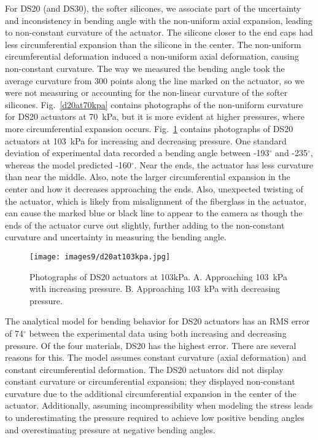 For DS20 (and DS30), the softer silicones, we associate part of the uncertainty and inconsistency in bending angle with the non-uniform axial expansion, leading to non-constant curvature of the actuator. The silicone closer to the end caps had less circumferential expansion than the silicone in the center. The non-uniform circumferential deformation induced a non-uniform axial deformation, causing non-constant curvature. The way we measured the bending angle took the average curvature from 300 points along the line marked on the actuator, so we were not measuring or accounting for the non-linear curvature of the softer silicones. Fig.~\ref{d20at70kpa} contains photographs of the non-uniform curvature for DS20 actuators at 70~kPa, but it is more evident at higher pressures, where more circumferential expansion occurs. Fig.~\ref{fig:d20at103kpa} contains photographs of DS20 actuators at 103~kPa for increasing and decreasing pressure. One standard deviation of experimental data recorded a bending angle between -193$^\circ$ and -235$^\circ$, whereas the model predicted -160$^\circ$. Near the ends, the actuator has less curvature than near the middle. Also, note the larger circumferential expansion in the center and how it decreases approaching the ends. Also, unexpected twisting of the actuator, which is likely from misalignment of the fiberglass in the actuator, can cause the marked blue or black line to appear to the camera as though the ends of the actuator curve out slightly, further adding to the non-constant curvature and uncertainty in measuring the bending angle.
\\
\begin{figure}[ht]
    \centering
     \texttt{[image: images9/d20at103kpa.jpg]}
    \caption{Photographs of DS20 actuators at 103kPa. A. Approaching 103~kPa with increasing pressure. B. Approaching 103~kPa with decreasing pressure.}
    \label{fig:d20at103kpa}
\end{figure}

The analytical model for bending behavior for DS20 actuators has an RMS error of 74$^\circ$ between the experimental data using both increasing and decreasing pressure. Of the four materials, DS20 has the highest error. There are several reasons for this. The model assumes constant curvature (axial deformation) and constant circumferential deformation. The DS20 actuators did not display constant curvature or circumferential expansion; they displayed non-constant curvature due to the additional circumferential expansion in the center of the actuator. Additionally, assuming incompressibility when modeling the stress leads to underestimating the pressure required to achieve low positive bending angles and overestimating pressure at negative bending angles. 

